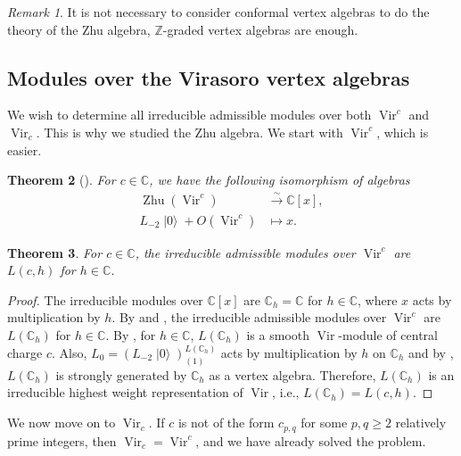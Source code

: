 \documentclass[a4paper, 12pt, reqno]{amsart}
\newtheorem{theorem}{Theorem}[section]
\theoremstyle{remark}
\newtheorem{remark}[theorem]{Remark}
\DeclareMathOperator{\Vir}{Vir}
\DeclareMathOperator{\vac}{|0\rangle}
\DeclareMathOperator{\Zhu}{Zhu}
\begin{document}
\begin{remark}
  \label{rmk:36}
  It is not necessary to consider conformal vertex algebras to do the theory of the Zhu algebra, $\mathbb{Z}$-graded vertex algebras are enough.
\end{remark}

\subsection{Modules over the Virasoro vertex algebras}
\label{sec:modul-over-viras}

We wish to determine all irreducible admissible modules over both $\Vir^c$ and $\Vir_c$.
This is why we studied the Zhu algebra.
We start with $\Vir^c$, which is easier.

\begin{theorem}[{\cite{wang_rationality_1993}}]
  \label{thr:41}
  For $c \in \mathbb{C}$, we have the following isomorphism of algebras
  \begin{align*}
    \Zhu(\Vir^c) &\xrightarrow{\sim} \mathbb{C}[x], \\
    L_{-2}\vac + O(\Vir^c) &\mapsto x.
  \end{align*}
\end{theorem}

\begin{theorem}
  \label{thr:42}
  For $c \in \mathbb{C}$, the irreducible admissible modules over $\Vir^c$ are $L(c, h)$ for $h \in \mathbb{C}$.
\end{theorem}

\begin{proof}
  The irreducible modules over $\mathbb{C}[x]$ are $\mathbb{C}_h = \mathbb{C}$ for $h \in \mathbb{C}$, where $x$ acts by multiplication by $h$.
  By  and , the irreducible admissible modules over $\Vir^c$ are $L(\mathbb{C}_h)$ for $h \in \mathbb{C}$.
  By , for $h \in \mathbb{C}$, $L(\mathbb{C}_h)$ is a smooth $\Vir$-module of central charge $c$.
  Also, $L_0 = (L_{-2}\vac)^{L(\mathbb{C}_h)}_{(1)}$ acts by multiplication by $h$ on $\mathbb{C}_h$ and by , $L(\mathbb{C}_h)$ is strongly generated by $\mathbb{C}_h$ as a vertex algebra.
  Therefore, $L(\mathbb{C}_h)$ is an irreducible highest weight representation of $\Vir$, i.e., $L(\mathbb{C}_h) = L(c, h)$.
\end{proof}

We now move on to $\Vir_c$.
If $c$ is not of the form $c_{p, q}$ for some $p, q \ge 2$ relatively prime integers, then $\Vir_c = \Vir^c$, and we have already solved the problem.
\end{document}
